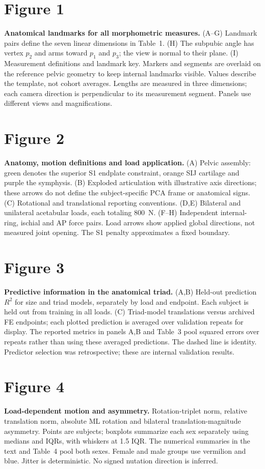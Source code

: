\section*{Figure 1}
\textbf{Anatomical landmarks for all morphometric measures.} (A--G) Landmark pairs define the seven linear dimensions in Table~1. (H) The subpubic angle has vertex $p_2$ and arms toward $p_1$ and $p_3$; the view is normal to their plane. (I) Measurement definitions and landmark key. Markers and segments are overlaid on the reference pelvic geometry to keep internal landmarks visible. Values describe the template, not cohort averages. Lengths are measured in three dimensions; each camera direction is perpendicular to its measurement segment. Panels use different views and magnifications.

\section*{Figure 2}
\textbf{Anatomy, motion definitions and load application.} (A) Pelvic assembly: green denotes the superior S1 endplate constraint, orange SIJ cartilage and purple the symphysis. (B) Exploded articulation with illustrative axis directions; these arrows do not define the subject-specific PCA frame or anatomical signs. (C) Rotational and translational reporting conventions. (D,E) Bilateral and unilateral acetabular loads, each totaling 800~N. (F--H) Independent internal-ring, ischial and AP force pairs. Load arrows show applied global directions, not measured joint opening. The S1 penalty approximates a fixed boundary.

\section*{Figure 3}
\textbf{Predictive information in the anatomical triad.} (A,B) Held-out prediction $R^2$ for size and triad models, separately by load and endpoint. Each subject is held out from training in all loads. (C) Triad-model translations versus archived FE endpoints; each plotted prediction is averaged over validation repeats for display. The reported metrics in panels A,B and Table~3 pool squared errors over repeats rather than using these averaged predictions. The dashed line is identity. Predictor selection was retrospective; these are internal validation results.

\section*{Figure 4}
\textbf{Load-dependent motion and asymmetry.} Rotation-triplet norm, relative translation norm, absolute ML rotation and bilateral translation-magnitude asymmetry. Points are subjects; boxplots summarize each sex separately using medians and IQRs, with whiskers at 1.5 IQR. The numerical summaries in the text and Table~4 pool both sexes. Female and male groups use vermilion and blue. Jitter is deterministic. No signed nutation direction is inferred.

